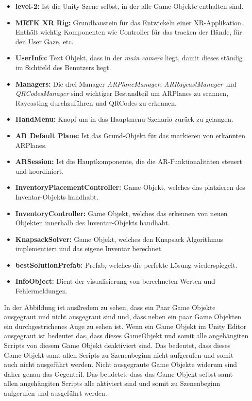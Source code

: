 \begin{itemize}
    \item \textbf{level-2:} Ist die Unity Szene selbst, in der alle Game-Objekte enthalten sind.
    \item \textbf{MRTK XR Rig:} Grundbaustein für das Entwickeln einer XR-Applikation. Enthält wichtig Komponenten
    wie Controller für das tracken der Hände, für den User Gaze, etc.
    \item \textbf{UserInfo:} Text Objekt, dass in der \textit{main camera } liegt, damit dieses ständig im Sichtfeld des
    Benutzers liegt.
    \item \textbf{Managers:} Die drei Manager \textit{ARPlaneManager}, \textit{ARRaycastManager} und \textit{QRCodesManager}
    sind wichtiger Bestandteil um ARPlanes zu scannen, Raycasting durchzuführen und QRCodes zu erkennen.
    \item \textbf{HandMenu:} Knopf um in das Hauptmenu-Szenario zurück zu gelangen.
    \item \textbf{AR Default Plane:} Ist das Grund-Objekt für das markieren von erkannten ARPlanes.
    \item \textbf{ARSession:} Ist die Hauptkomponente, die die AR-Funktionalitäten steuert und koordiniert.
    \item \textbf{InventoryPlacementController:} Game Objekt, welches das platzieren des Inventar-Objekts handhabt.
    \item \textbf{InventoryController:} Game Objekt, welches das erkennen von neuen Objekten innerhalb des Inventar-Objekts handhabt.
    \item \textbf{KnapsackSolver:} Game Objekt, welches den Knapsack Algorithmus implementiert und das eigene Inventar berechnet.
    \item \textbf{bestSolutionPrefab:} Prefab, welches die perfekte Lösung wiederspiegelt.
    \item \textbf{InfoObject:} Dient der visualisierung von berechneten Werten und Fehlermeldungen.
\end{itemize}

In der Abbildung ist ausßredem zu sehen, dass ein Paar Game Objekte ausgegraut und nicht ausgegraut sind und, dass neben ein paar Game Objekten ein durchgestrichenes Auge zu sehen ist.
Wenn ein Game Objekt im Unity Editor ausgegraut ist bedeutet das, dass dieses GameObjekt und somit alle angehängiten Scripts von diesem Game Objekt deaktiviert sind.
Das bedeutet, dass dieses Game Objekt samt allen Scripts zu Szenenbeginn nicht aufgerufen und somit auch nicht ausgeführt werden. Nicht ausgegraute Game Objekte widerum sind
daher genau das Gegenteil. Das beudetet, dass das Game Objekt selbst samt allen angehängiten Scripts alle aktiviert sind und somit zu Szenenbeginn aufgerufen und ausgeführt werden.

